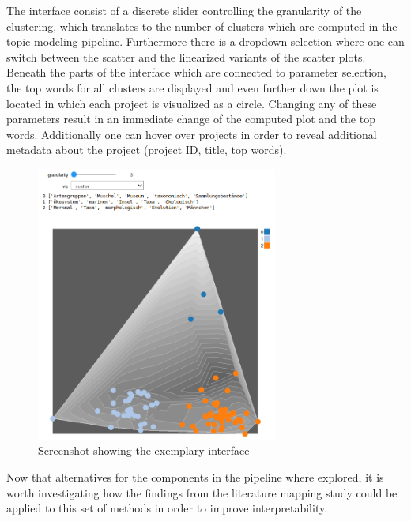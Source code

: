 The interface consist of a discrete slider controlling the granularity of the clustering, which translates to the number of clusters which are computed in the topic modeling pipeline. Furthermore there is a dropdown selection where one can switch between the scatter and the linearized variants of the scatter plots.
Beneath the parts of the interface which are connected to parameter selection, the top words for all clusters are displayed and even further down the plot is located in which each project is visualized as a circle. Changing any of these parameters result in an immediate change of the computed plot and the top words. Additionally one can hover over projects in order to reveal additional metadata about the project (project ID, title, top words).

\begin{figure}[htbp!]
	\centering
	\includegraphics[width=300px]{../chapters/implementation/pics/interface}
	\caption{\label{pic:interface} Screenshot showing the exemplary interface}
\end{figure}

Now that alternatives for the components in the pipeline where explored, it is worth investigating how the findings from the literature mapping study could be applied to this set of methods in order to improve interpretability.

